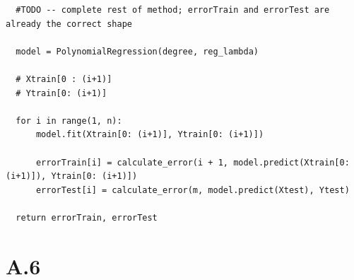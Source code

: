 \documentclass{article}
\newcommand{\1}{\mathbf{1}}
\begin{document}
{\begin{verbatim}
  #TODO -- complete rest of method; errorTrain and errorTest are already the correct shape

  model = PolynomialRegression(degree, reg_lambda)

  # Xtrain[0 : (i+1)]
  # Ytrain[0: (i+1)]

  for i in range(1, n):
      model.fit(Xtrain[0: (i+1)], Ytrain[0: (i+1)])

      errorTrain[i] = calculate_error(i + 1, model.predict(Xtrain[0: (i+1)]), Ytrain[0: (i+1)])
      errorTest[i] = calculate_error(m, model.predict(Xtest), Ytest)

  return errorTrain, errorTest
\end{verbatim}


}

\section*{A.6}
\end{document}
